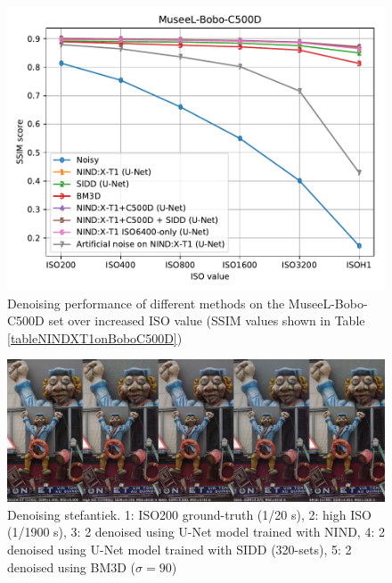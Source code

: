 \begin{figure}[!htbp]
\centering
\includegraphics[width=1\linewidth]{gfx/graphs/boboc500d.pdf}
%
\caption[Denoising performance on the MuseeL-Bobo-C500D set over increased ISO value]{Denoising performance of different methods on the MuseeL-Bobo-C500D set over increased ISO value (\acs{SSIM} values shown in Table \ref{tableNINDXT1onBoboC500D})}
\label{fig:boboc500d}
\end{figure}

\begin{figure}[!htbp]
\centering
\includegraphics[width=1\linewidth]{gfx/comp/stefantiek.jpg}
\caption[Denoising stefantiek (visual comparison)]{Denoising stefantiek. 1: ISO200 ground-truth (1/20 s), 2: high ISO (1/1900 s), 3: 2 denoised using U-Net model trained with \ac{NIND}, 4: 2 denoised using U-Net model trained with \ac{SIDD} (320-sets), 5: 2 denoised using \ac{BM3D} ($\sigma=90$)}
\label{fig:stefantiek}
\end{figure}


